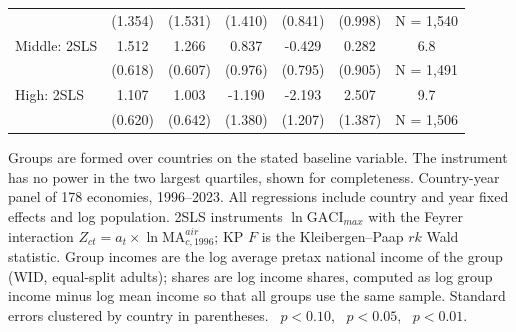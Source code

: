 \begin{table}[H]
\begin{minipage}{\linewidth}
{\begin{tabular}{lcccccc}
 & (1.354) & (1.531) & (1.410) & (0.841) & (0.998) & N = 1{,}540 \\
Middle: 2SLS & 1.512\sym{**} & 1.266\sym{**} & 0.837 & -0.429 & 0.282 & 6.8 \\
 & (0.618) & (0.607) & (0.976) & (0.795) & (0.905) & N = 1{,}491 \\
High: 2SLS & 1.107\sym{*} & 1.003 & -1.190 & -2.193\sym{*} & 2.507\sym{*} & 9.7 \\
 & (0.620) & (0.642) & (1.380) & (1.207) & (1.387) & N = 1{,}506 \\
\bottomrule
\end{tabular}}
\par\vspace{3pt}\begin{flushleft}\footnotesize Groups are formed over countries on the stated baseline variable. The instrument has no power in the two largest quartiles, shown for completeness. Country-year panel of 178 economies, 1996--2023. All regressions include country and year fixed effects and log population. 2SLS instruments $\ln\mathrm{GACI}_{max}$ with the Feyrer interaction $Z_{ct}=a_t\times\ln\mathrm{MA}^{air}_{c,1996}$; KP $F$ is the Kleibergen--Paap $rk$ Wald statistic. Group incomes are the log average pretax national income of the group (WID, equal-split adults); shares are log income shares, computed as log group income minus log mean income so that all groups use the same sample. Standard errors clustered by country in parentheses. \sym{*}~$p<0.10$, \sym{**}~$p<0.05$, \sym{***}~$p<0.01$.\end{flushleft}
\end{minipage}
\end{table}

